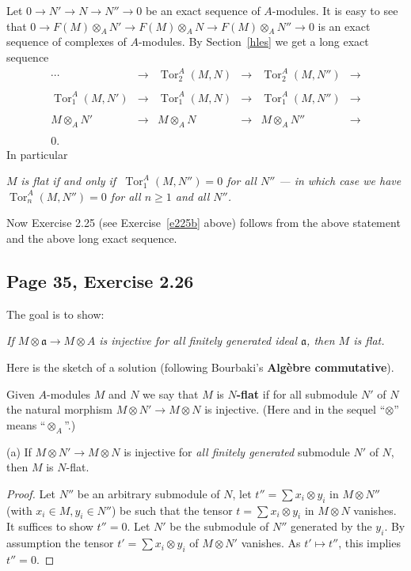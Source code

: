 \documentclass[parskip=half,fontsize=12pt]{scrartcl}%
\newcommand{\mf}{\mathfrak}
\newcommand{\aaa}{\mf a}
\newcommand{\Tor}{\operatorname{Tor}}
\begin{document}
Let $0\to N'\to N\to N''\to0$ be an exact sequence of $A$-modules. It is easy to see that $0\to F(M)\otimes_AN'\to F(M)\otimes_AN\to F(M)\otimes_AN''\to0$ is an exact sequence of complexes of $A$-modules. By Section~\ref{hles} we get a long exact sequence 
$$
\begin{matrix}
\cdots&\to&\Tor^A_2(M,N)&\to&\Tor^A_2(M,N'')&\to\\ \\ 
\Tor^A_1(M,N')&\to&\Tor^A_1(M,N)&\to&\Tor^A_1(M,N'')&\to\\ \\ 
M\otimes_AN'&\to&M\otimes_AN&\to&M\otimes_AN''&\to\\ \\ 
0.
\end{matrix}
$$ 
In particular 

$M$ \emph{is flat if and only if $\ \Tor^A_1(M,N'')=0$ for all $N''$ --- in which case we have $\Tor^A_n(M,N'')=0$ for all $n\ge1$ and all $N''$.}

Now Exercise 2.25 (see Exercise~\ref{e225b} above) follows from the above statement and the above long exact sequence.

\subsection{Page 35, Exercise 2.26}\label{35}%

The goal is to show: 

\emph{If $M\otimes\aaa\to M\otimes A$ is injective for all finitely generated ideal $\aaa$, then $M$ is flat.}

Here is the sketch of a solution (following Bourbaki's \textbf{Algèbre commutative}).

Given $A$-modules $M$ and $N$ we say that $M$ is $N$\textbf{-flat} if for all submodule $N'$ of $N$ the natural morphism $M\otimes N'\to M\otimes N$ is injective. (Here and in the sequel ``$\otimes$'' means ``$\otimes_A$''.) 

(a) If $M\otimes N'\to M\otimes N$ is injective for \emph{all finitely generated} submodule $N'$ of $N$, then $M$ is $N$-flat.

\begin{proof} 
Let $N''$ be an arbitrary submodule of $N$, let $t''=\sum x_i\otimes y_i$ in $M\otimes N''$ (with $x_i\in M,y_i\in N''$) be such that the tensor $t=\sum x_i\otimes y_i$ in $M\otimes N$ vanishes. It suffices to show $t''=0$. Let $N'$ be the submodule of $N''$ generated by the $y_i$. By assumption the tensor $t'=\sum x_i\otimes y_i$ of $M\otimes N'$ vanishes. As $t'\mapsto t''$, this implies $t''=0$. 
\end{proof}
\end{document}
